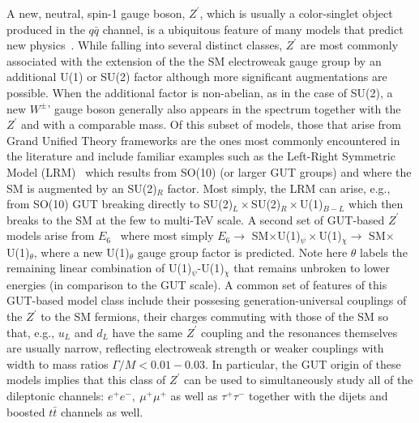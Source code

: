 \documentclass[a4paper,11pt]{article}
\newcommand{\Zp}{\ensuremath{Z^{\prime}}}
\begin{document}
A new, neutral, spin-1 gauge boson, $\Zp$, which is usually a color-singlet object produced in the $q\bar q$ channel, is a ubiquitous feature of many models that predict new
physics~\cite{Langacker:2008yv,Rizzo:2006nw,Carena:2004xs,Salvioni:2009mt}.  While falling into several distinct classes, $\Zp$ are most commonly associated with the
extension of the the SM electroweak gauge group by an additional U(1) or SU(2) factor although more significant augmentations are possible. When the additional factor is non-abelian,
as in the case of SU(2), a new $W^\pm$' gauge boson generally also appears in the spectrum together with the $\Zp$ and with a comparable mass.  Of this subset of models, those
that arise from Grand Unified Theory frameworks are the ones most commonly encountered in the literature and include familiar examples such as the Left-Right Symmetric
Model (LRM)~\cite{Senjanovic:1975rk,Senjanovic:1975rk,Mohapatra:1980yp} which results from SO(10)
(or larger GUT groups) and where the SM is augmented by an SU(2)$_R$ factor. Most simply, the LRM can arise, e.g., from SO(10) GUT breaking directly to
SU(2)$_L \times$SU(2)$_R \times$U(1)$_{B-L}$ which then breaks to the SM at the few to multi-TeV scale. A second set of GUT-based $\Zp$ models arise from
$E_6$~\cite{Robinett:1982tq,London:1986dk,Hewett:1988xc,Joglekar:2016yap} where most simply $E_6 \rightarrow$ SM$\times$U(1)$_\psi \times$U(1)$_\chi \rightarrow $ SM$
\times$U(1)$_\theta$, where a new U(1)$_\theta$ gauge group factor is predicted. Note here $\theta$ labels the remaining linear combination of U(1)$_\psi$-U(1)$_\chi$ that remains
unbroken to lower energies (in comparison to the GUT scale).  A common set of features of this GUT-based model class include their possesing generation-universal couplings
of the $\Zp$ to the SM fermions, their charges commuting with those of the SM so that, e.g., $u_L$ and $d_L$ have the same $\Zp$ coupling and the resonances themselves are usually
narrow, reflecting electroweak strength or weaker couplings with width to mass ratios $\Gamma/M < 0.01-0.03$. In particular, the GUT origin of these models
implies that this class of $\Zp$ can be used to simultaneously study all of the dileptonic channels: $e^+e^-,~\mu^+\mu^+$ as well as $\tau^+\tau^-$ together with the dijets and boosted
$t\bar t$ channels as well.
\end{document}
